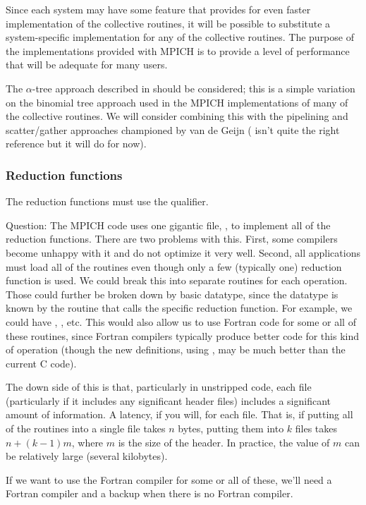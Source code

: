 \documentclass{article}
\begin{document}
Since each system may have some feature that provides for even faster
implementation of the collective routines, it will be possible to
substitute a system-specific implementation for any of the collective
routines.  The purpose of the implementations provided with MPICH is
to provide a level of performance that will be adequate
for many users.  

The $\alpha$-tree approach described in
\cite{bern:mpi-collective:hpcn99} should be considered; this is a
simple variation on the binomial tree approach used in the MPICH
implementations of many of the collective routines.  We will consider
combining this with the pipelining and scatter/gather approaches
championed by van de Geijn (\cite{vandegeijn} isn't quite the right
reference but it will do for now).


\subsubsection{Reduction functions}
The reduction functions must use the  qualifier.

Question:
The MPICH code uses one gigantic file, , to implement
all of the reduction functions.  There are two problems with this.
First, some compilers become unhappy with it and do not optimize it
very well.  Second, all applications must load all of the routines
even though only a few (typically one) reduction function is used.  We
could break this into separate routines for each operation.  Those
could further be broken down by basic datatype, since the datatype is
known by the routine that calls the specific reduction function.  
For example, we could have ,
, etc.  This would also allow us to use Fortran
code for some or all of these routines, since Fortran compilers
typically produce better code for this kind of operation (though the
new definitions, using , may be much better than the
current C code).

The down side of this is that, particularly in unstripped code, each
file (particularly if it includes any significant header files)
includes a significant amount of information.  A latency, if you will,
for each file.  That is, if putting all of the routines into a single
file takes $n$ bytes, putting them into $k$ files takes $n + (k-1)m$,
where $m$ is the size of the header.  In practice, the value of $m$ can be
relatively large (several kilobytes).

If we want to use the Fortran compiler for some or all of these, we'll
need a Fortran compiler and a backup when there is no Fortran compiler.
\end{document}
